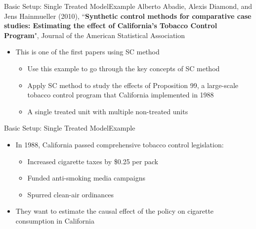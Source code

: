 \documentclass[dvipsnames,hyperref={pdfpagelabels=false}]{beamer}
\begin{document}
\begin{frame}{Basic Setup: Single Treated Model}{Example}
Alberto Abadie, Alexis Diamond, and Jens Hainmueller (2010), ``\textbf{Synthetic control methods for comparative case studies: Estimating the effect of California's Tobacco Control Program}", Journal of the American Statistical Association	
\begin{itemize}
\vspace{0.2cm}
\item This is one of the first papers using SC method
\vspace{0.2cm}
\begin{itemize}
\item Use this example to go through the key concepts of SC method	
	\vspace{0.2cm}
\item Apply SC method to study the effects of Proposition 99, a large-scale tobacco control program that California implemented in 1988	
\vspace{0.2cm}	
\item A single treated unit with multiple non-treated units		
\end{itemize}	

\end{itemize}
\end{frame}



\begin{frame}{Basic Setup: Single Treated Model}{Example}
\begin{itemize}
\item In 1988, California passed comprehensive tobacco control legislation:
\begin{itemize}
\vspace{0.2cm}
\item Increased cigarette taxes by \$0.25 per pack
\vspace{0.2cm}
\item Funded anti-smoking media campaigns
\vspace{0.2cm}
\item Spurred clean-air ordinances
\end{itemize}
\vspace{0.2cm}
\item They want to estimate the causal effect of the policy on cigarette consumption in California
\end{itemize}
\end{frame}
\end{document}
